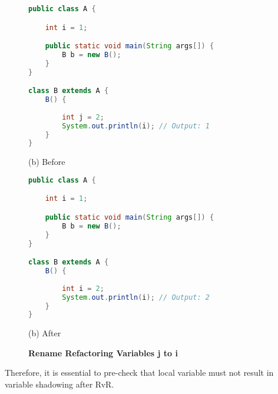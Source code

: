\begin{figure}[th]
\centering
\begin{minipage}[t]{0.8\linewidth}
\begin{lstlisting}[language=java, basicstyle=\scriptsize\ttfamily,frame=single]
public class A {

    int i = 1;

    public static void main(String args[]) {
        B b = new B(); 
    }
}

class B extends A {
    B() {
    	
        int j = 2;
        System.out.println(i); // Output: 1
    }
}
\end{lstlisting}
\centering(b) Before 
\end{minipage}
\hfill
\begin{minipage}[t]{0.8\linewidth}
\begin{lstlisting}[language=java, basicstyle=\scriptsize\ttfamily,frame=single]
public class A {

    int i = 1;

    public static void main(String args[]) {
        B b = new B(); 
    }
}

class B extends A {
    B() {
    	
        int i = 2;
        System.out.println(i); // Output: 2
    }
}
\end{lstlisting}
\centering(b) After 
\end{minipage}
\caption{\textbf{Rename Refactoring Variables j to i}}
\label{figure:precond5_4}
\end{figure}


Therefore, it is essential to pre-check that local variable must not result in variable shadowing after RvR.